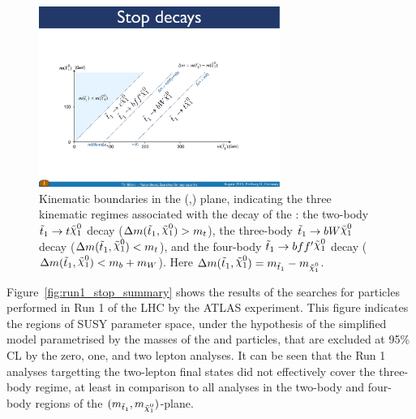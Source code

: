 \begin{figure}[!htb]
    \begin{center}
        \includegraphics[width=0.7\textwidth]{figures/search_stop2l/signal/stop_LSP_boundaries}
        \caption{
            Kinematic boundaries in the (\stopone,\ninoone) plane, indicating the three kinematic
            regimes associated with the decay of the \stopone: the two-body $\stopone \rightarrow t \ninoone$
            decay ($\Delta m(\stopone, \ninoone) > m_t$), the three-body $\stopone \rightarrow b W \ninoone$ decay
            ($\Delta m(\stopone, \ninoone) < m_t$), and the four-body $\stopone \rightarrow b f f^{\prime} \ninoone$
            decay ($\Delta m(\stopone, \ninoone) < m_b + m_W$).
            Here $\Delta m(\stopone, \ninoone) = m_{\stopone} - m_{\ninoone}$.
        }
        \label{fig:stop_boundaries}
    \end{center}
\end{figure}

Figure~\ref{fig:run1_stop_summary} shows the results of the searches for \stopone particles performed
in Run 1 of the LHC by the ATLAS experiment.
This figure indicates the regions of SUSY parameter space, under the hypothesis of the
simplified model parametrised by the masses of the \stopone and \ninoone particles,
that are excluded at 95\% CL by the zero, one, and two lepton analyses.
It can be seen that the Run 1 analyses targetting the two-lepton final states did not effectively
cover the three-body regime, at least in comparison to all analyses in the two-body and four-body regions
of the $(m_{\stopone}, m_{\ninoone})$-plane.

